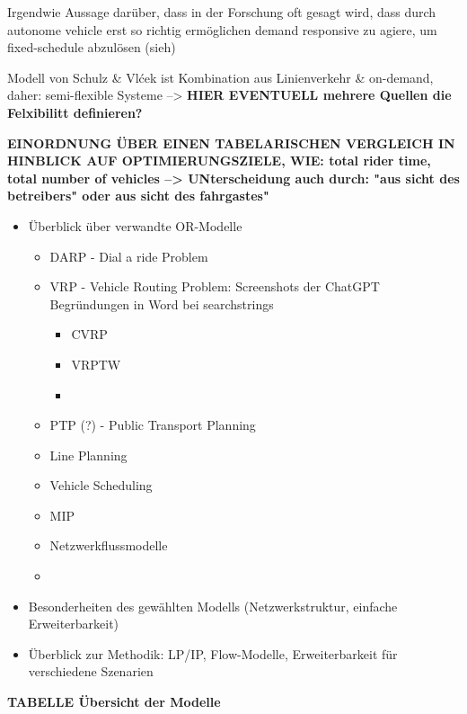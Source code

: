 Irgendwie Aussage darüber, dass in der Forschung oft gesagt wird, dass durch autonome vehicle erst so richtig ermöglichen demand responsive zu agiere, um fixed-schedule abzulösen (sieh)

Modell von Schulz \& Vlćek ist Kombination aus Linienverkehr \& on-demand, daher: semi-flexible Systeme --> \textbf{HIER EVENTUELL mehrere Quellen die Felxibilitt definieren?}

\textbf{EINORDNUNG ÜBER EINEN TABELARISCHEN VERGLEICH IN HINBLICK AUF OPTIMIERUNGSZIELE, WIE: total rider time, total number of vehicles --> UNterscheidung auch durch: "aus sicht des betreibers" oder aus sicht des fahrgastes"}


\begin{itemize}
    \item Überblick über verwandte OR-Modelle
    \begin{itemize}
        \item DARP - Dial a ride Problem
        \item VRP - Vehicle Routing Problem: Screenshots der ChatGPT Begründungen in Word bei searchstrings
        \begin{itemize}
            \item CVRP
            \item VRPTW
            \item 
        \end{itemize}
        \item PTP (?) - Public Transport Planning
        \item Line Planning
        \item Vehicle Scheduling
        \item MIP
        \item Netzwerkflussmodelle
        \item 
    \end{itemize}
    \item Besonderheiten des gewählten Modells (Netzwerkstruktur, einfache Erweiterbarkeit)
    \item Überblick zur Methodik: LP/IP, Flow-Modelle, Erweiterbarkeit für verschiedene Szenarien
\end{itemize}

\begin{center}
    \textbf{TABELLE Übersicht der Modelle}
\end{center}




